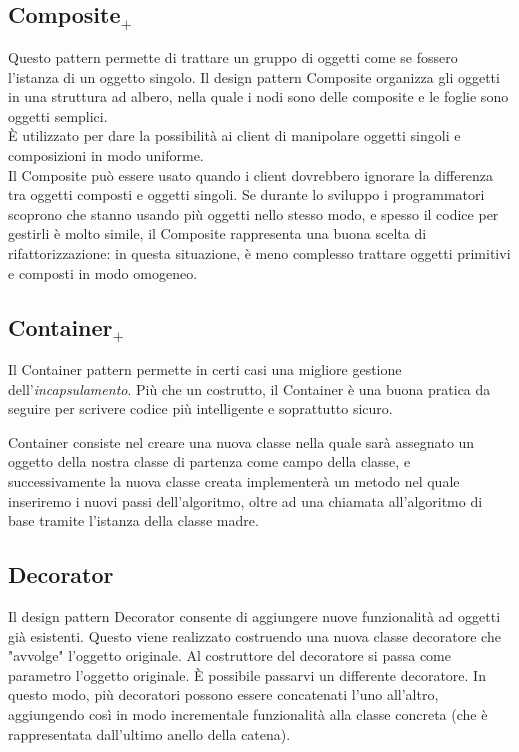 \subsection{Composite$_+$}
Questo pattern permette di trattare un gruppo di oggetti come se fossero l'istanza di un oggetto singolo. Il design pattern Composite organizza gli oggetti in una struttura ad albero, nella quale i nodi sono delle composite e le foglie sono oggetti semplici.\\

È utilizzato per dare la possibilità ai client di manipolare oggetti singoli e composizioni in modo uniforme. \\
Il Composite può essere usato quando i client dovrebbero ignorare la differenza tra oggetti composti e oggetti singoli. Se durante lo sviluppo i programmatori scoprono che stanno usando più oggetti nello stesso modo, e spesso il codice per gestirli è molto simile, il Composite rappresenta una buona scelta di rifattorizzazione: in questa situazione, è meno complesso trattare oggetti primitivi e composti in modo omogeneo.

\subsection{Container$_+$}
Il Container pattern permette in certi casi una migliore gestione dell'\textit{incapsulamento}. Più che un costrutto, il Container è una buona pratica da seguire per scrivere codice più intelligente e soprattutto sicuro. 

Container consiste nel creare una nuova classe nella quale sarà assegnato un oggetto della nostra classe di partenza come campo della classe, e successivamente la nuova classe creata implementerà un metodo nel quale inseriremo i nuovi passi dell'algoritmo, oltre ad una chiamata all'algoritmo di base tramite l'istanza della classe madre.

\subsection{Decorator}
Il design pattern Decorator consente di aggiungere nuove funzionalità ad oggetti già esistenti. Questo viene realizzato costruendo una nuova classe decoratore che "avvolge" l'oggetto originale. Al costruttore del decoratore si passa come parametro l'oggetto originale. È possibile passarvi un differente decoratore. In questo modo, più decoratori possono essere concatenati l'uno all'altro, aggiungendo così in modo incrementale funzionalità alla classe concreta (che è rappresentata dall'ultimo anello della catena).

